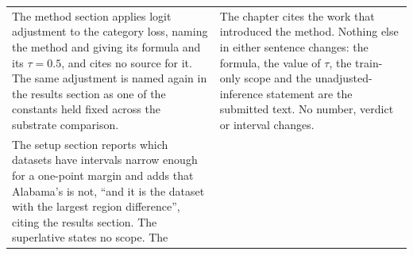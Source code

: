 \begin{table}[htb]
\begin{tabular}{@{}p{}p{}@{}}
The method section applies logit adjustment to the category
loss, naming the method and giving its formula and its
$\tau=0.5$, and cites no source for it. The same adjustment is
named again in the results section as one of the constants held
fixed across the substrate comparison. &
The chapter cites the work that introduced the method. Nothing
else in either sentence changes: the formula, the value of $\tau$,
the train-only scope and the unadjusted-inference statement are
the submitted text. No number, verdict or interval changes. \\
\addlinespace
The setup section reports which datasets have intervals narrow
enough for a one-point margin and adds that Alabama's is not,
``and it is the dataset with the largest region difference'',
citing the results section. The superlative states no scope. The

\end{tabular}
\end{table}
